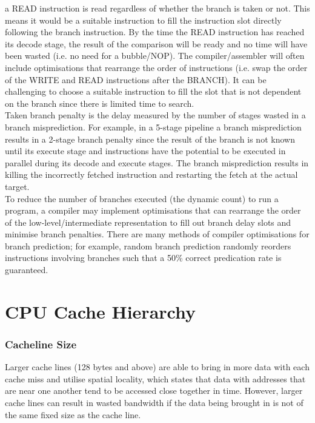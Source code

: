 \documentclass[a4paper, 12pt, oneside]{book}
\begin{document}
a READ instruction is read regardless of whether the branch is taken or not. This means it would be a suitable instruction to fill the instruction slot directly following the branch instruction. By the time the READ instruction has reached its decode stage, the result of the comparison will be ready and no time will have been wasted (i.e. no need for a bubble/NOP). The compiler/assembler will often include optimisations that rearrange the order of instructions (i.e. swap the order of the WRITE and READ instructions after the BRANCH). It can be challenging to choose a suitable instruction to fill the slot that is not dependent on the branch since there is limited time to search.\\

Taken branch penalty is the delay measured by the number of stages wasted in a branch misprediction. For example, in a 5-stage pipeline a branch misprediction results in a 2-stage branch penalty since the result of the branch is not known until its execute stage and instructions have the potential to be executed in parallel during its decode and execute stages. The branch misprediction results in killing the incorrectly fetched instruction and restarting the fetch at the actual target.\\

To reduce the number of branches executed (the dynamic count) to run a program, a compiler may implement optimisations that can rearrange the order of the low-level/intermediate representation to fill out branch delay slots and minimise branch penalties. There are many methods of compiler optimisations for branch prediction; for example, random branch prediction randomly reorders instructions involving branches such that a 50\% correct predication rate is guaranteed.



\section{CPU Cache Hierarchy}

\subsubsection{Cacheline Size}
Larger cache lines (128 bytes and above) are able to bring in more data with each cache miss and utilise spatial locality, which states that data with addresses that are near one another tend to be accessed close together in time. However, larger cache lines can result in wasted bandwidth if the data being brought in is not of the same fixed size as the cache line. \\
\end{document}
